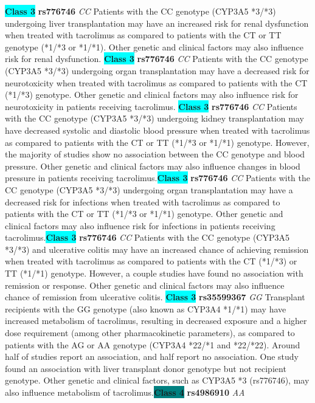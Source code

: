 \documentclass{report}
\begin{document}
\textbf{\colorbox{cyan} {Class 3}} \textbf{ rs776746 } \textit{ CC }
Patients with the CC genotype (CYP3A5 *3/*3) undergoing liver transplantation may have an increased risk for renal dysfunction when treated with tacrolimus as compared to patients with the CT or TT genotype (*1/*3 or *1/*1). Other genetic and clinical factors may also influence risk for renal dysfunction. \newline\textbf{\colorbox{cyan} {Class 3}} \textbf{ rs776746 } \textit{ CC }
Patients with the CC genotype (CYP3A5 *3/*3) undergoing organ transplantation may have a decreased risk for neurotoxicity when treated with tacrolimus as compared to patients with the CT (*1/*3) genotype. Other genetic and clinical factors may also influence risk for neurotoxicity in patients receiving tacrolimus. \newline\textbf{\colorbox{cyan} {Class 3}} \textbf{ rs776746 } \textit{ CC }
Patients with the CC genotype (CYP3A5 *3/*3) undergoing kidney transplantation may have decreased systolic and diastolic blood pressure when treated with tacrolimus as compared to patients with the CT or TT (*1/*3 or *1/*1) genotype. However, the majority of studies show no association between the CC genotype and blood pressure. Other genetic and clinical factors may also influence changes in blood pressure in patients receiving tacrolimus.\newline\textbf{\colorbox{cyan} {Class 3}} \textbf{ rs776746 } \textit{ CC }
Patients with the CC genotype (CYP3A5 *3/*3) undergoing organ transplantation may have a decreased risk for infections when treated with tacrolimus as compared to patients with the CT or TT (*1/*3 or *1/*1) genotype. Other genetic and clinical factors may also influence risk for infections in patients receiving tacrolimus.\newline\textbf{\colorbox{cyan} {Class 3}} \textbf{ rs776746 } \textit{ CC }
Patients with the CC genotype (CYP3A5 *3/*3) and ulcerative colitis may have an increased chance of achieving remission when treated with tacrolimus as compared to patients with the CT (*1/*3) or TT (*1/*1) genotype. However, a couple studies have found no association with remission or response. Other genetic and clinical factors may also influence chance of remission from ulcerative colitis. \newline\textbf{\colorbox{cyan} {Class 3}} \textbf{ rs35599367 } \textit{ GG }
Transplant recipients with the GG genotype (also known as CYP3A4 *1/*1) may have increased metabolism of tacrolimus, resulting in decreased exposure and a higher dose requirement (among other pharmacokinetic parameters), as compared to patients with the AG or AA genotype (CYP3A4 *22/*1 and *22/*22). Around half of studies report an association, and half report no association. One study found an association with liver transplant donor genotype but not recipient genotype. Other genetic and clinical factors, such as CYP3A5 *3 (rs776746), may also influence metabolism of tacrolimus.\newline\textbf{\colorbox{teal} {Class 4}} \textbf{ rs4986910 } \textit{ AA }
\end{document}
